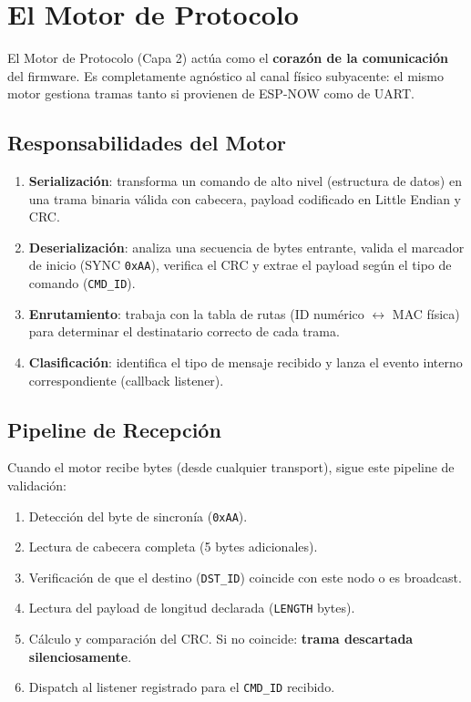 \section{El Motor de Protocolo}

El Motor de Protocolo (Capa 2) actúa como el \textbf{corazón de la comunicación} del firmware.
Es completamente agnóstico al canal físico subyacente: el mismo motor gestiona tramas 
tanto si provienen de ESP-NOW como de UART.

\subsection{Responsabilidades del Motor}

\begin{enumerate}
    \item \textbf{Serialización}: transforma un comando de alto nivel (estructura de datos)
          en una trama binaria válida con cabecera, payload codificado en Little Endian y CRC.
    \item \textbf{Deserialización}: analiza una secuencia de bytes entrante, valida el
          marcador de inicio (SYNC \texttt{0xAA}), verifica el CRC y extrae el payload
          según el tipo de comando (\texttt{CMD\_ID}).
    \item \textbf{Enrutamiento}: trabaja con la tabla de rutas (ID numérico $\leftrightarrow$
          MAC física) para determinar el destinatario correcto de cada trama.
    \item \textbf{Clasificación}: identifica el tipo de mensaje recibido y lanza el
          evento interno correspondiente (callback listener).
\end{enumerate}

\subsection{Pipeline de Recepción}

Cuando el motor recibe bytes (desde cualquier transport), sigue este pipeline de validación:

\begin{enumerate}
    \item Detección del byte de sincronía (\texttt{0xAA}).
    \item Lectura de cabecera completa (5 bytes adicionales).
    \item Verificación de que el destino (\texttt{DST\_ID}) coincide con este nodo o es broadcast.
    \item Lectura del payload de longitud declarada (\texttt{LENGTH} bytes).
    \item Cálculo y comparación del CRC. Si no coincide: \textbf{trama descartada silenciosamente}.
    \item Dispatch al listener registrado para el \texttt{CMD\_ID} recibido.
\end{enumerate}


